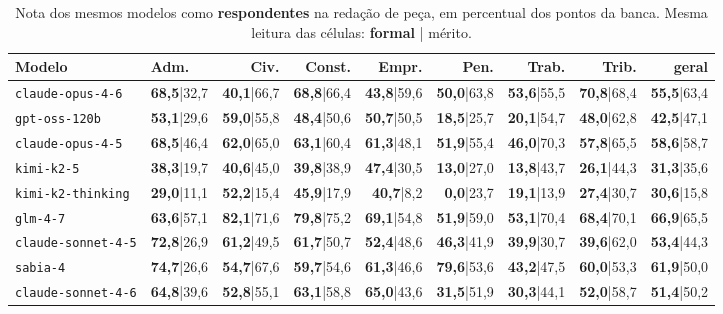 \documentclass{IOS-Book-Article}
\begin{document}
\begin{table}[!ht]
\centering
\caption{Nota dos mesmos modelos como \textbf{respondentes} na redação de peça, em percentual dos pontos da banca. Mesma leitura das células: \textbf{formal} | mérito.}
\footnotesize\setlength{\tabcolsep}{2pt}
\begin{tabular}{llrrrrrrr}
\hline
\textbf{Modelo} & \textbf{Adm.} & \textbf{Civ.} & \textbf{Const.} & \textbf{Empr.} & \textbf{Pen.} & \textbf{Trab.} & \textbf{Trib.} & \textbf{geral} \\
\hline
\texttt{claude-opus-4-6} & \textbf{68,5}|32,7 & \textbf{40,1}|66,7 & \textbf{68,8}|66,4 & \textbf{43,8}|59,6 & \textbf{50,0}|63,8 & \textbf{53,6}|55,5 & \textbf{70,8}|68,4 & \textbf{55,5}|63,4 \\
\texttt{gpt-oss-120b} & \textbf{53,1}|29,6 & \textbf{59,0}|55,8 & \textbf{48,4}|50,6 & \textbf{50,7}|50,5 & \textbf{18,5}|25,7 & \textbf{20,1}|54,7 & \textbf{48,0}|62,8 & \textbf{42,5}|47,1 \\
\texttt{claude-opus-4-5} & \textbf{68,5}|46,4 & \textbf{62,0}|65,0 & \textbf{63,1}|60,4 & \textbf{61,3}|48,1 & \textbf{51,9}|55,4 & \textbf{46,0}|70,3 & \textbf{57,8}|65,5 & \textbf{58,6}|58,7 \\
\texttt{kimi-k2-5} & \textbf{38,3}|19,7 & \textbf{40,6}|45,0 & \textbf{39,8}|38,9 & \textbf{47,4}|30,5 & \textbf{13,0}|27,0 & \textbf{13,8}|43,7 & \textbf{26,1}|44,3 & \textbf{31,3}|35,6 \\
\texttt{kimi-k2-thinking} & \textbf{29,0}|11,1 & \textbf{52,2}|15,4 & \textbf{45,9}|17,9 & \textbf{40,7}|8,2 & \textbf{0,0}|23,7 & \textbf{19,1}|13,9 & \textbf{27,4}|30,7 & \textbf{30,6}|15,8 \\
\texttt{glm-4-7} & \textbf{63,6}|57,1 & \textbf{82,1}|71,6 & \textbf{79,8}|75,2 & \textbf{69,1}|54,8 & \textbf{51,9}|59,0 & \textbf{53,1}|70,4 & \textbf{68,4}|70,1 & \textbf{66,9}|65,5 \\
\texttt{claude-sonnet-4-5} & \textbf{72,8}|26,9 & \textbf{61,2}|49,5 & \textbf{61,7}|50,7 & \textbf{52,4}|48,6 & \textbf{46,3}|41,9 & \textbf{39,9}|30,7 & \textbf{39,6}|62,0 & \textbf{53,4}|44,3 \\
\texttt{sabia-4} & \textbf{74,7}|26,6 & \textbf{54,7}|67,6 & \textbf{59,7}|54,6 & \textbf{61,3}|46,6 & \textbf{79,6}|53,6 & \textbf{43,2}|47,5 & \textbf{60,0}|53,3 & \textbf{61,9}|50,0 \\
\texttt{claude-sonnet-4-6} & \textbf{64,8}|39,6 & \textbf{52,8}|55,1 & \textbf{63,1}|58,8 & \textbf{65,0}|43,6 & \textbf{31,5}|51,9 & \textbf{30,3}|44,1 & \textbf{52,0}|58,7 & \textbf{51,4}|50,2 \\

\end{tabular}
\end{table}
\end{document}
